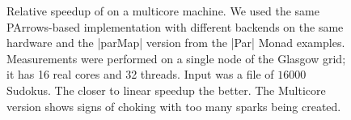 \begin{figure}
\centering
%
{\label{subfig:speedupSudokuSM16000}}%
{\label{subfig:performanceSudokuSM16000}}
\caption{Relative speedup of \sudokutest on a multicore machine. We used the same PArrows-based implementation with
  different backends on the same hardware and the |parMap| version from the |Par| Monad examples. Measurements were performed on a single node of the Glasgow
  grid; it has 16 real cores and 32 threads. Input was a file of $16000$ Sudokus. The
  closer to linear speedup the better. The Multicore version shows signs of choking with too many sparks being created.}
\label{fig:sudokuSMBenchmark16000}
\end{figure}
